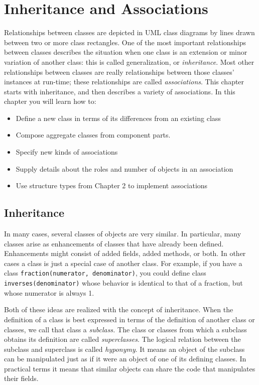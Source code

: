 \chapter{Inheritance and Associations}

Relationships between classes are depicted in UML class diagrams by
lines drawn between two or more class rectangles. One of the most
important relationships between classes describes the situation when
one class is an extension or minor variation of another class: this is
called generalization, or \textit{inheritance}. Most other
relationships between classes are really relationships between those
classes' instances at run-time; these
relationships are called \textit{associations}. This chapter starts
with inheritance, and then describes a variety of associations.
In this chapter you will learn how to:
\begin{itemize}\itemsep0pt
  \item Define a new class in terms of its differences from an existing class
  \item Compose aggregate classes from component parts.
  \item Specify new kinds of associations
  \item Supply details about the roles and number of objects in an association
  \item Use structure types from Chapter 2 to implement associations
\end{itemize}

\section{Inheritance}

In many cases, several classes of objects are very similar. In
particular, many classes arise as enhancements of classes that have
already been defined. Enhancements might consist of added fields, added
methods, or both. In other cases a class is just a special case of
another class. For example, if you have a class
\texttt{fraction(numerator, denominator)}, you could define class
\texttt{inverses(denominator)} whose behavior is identical to that of a
fraction, but whose numerator is always 1. 

Both of these ideas are realized with the concept of
inheritance. When the definition of a class is best
expressed in terms of the definition of another class or classes, we
call that class a \textit{subclass.} The class or
classes from which a subclass obtains its definition are called
\textit{superclass}\textit{es}. The logical relation
between the subclass and superclass is called \textit{hyponymy}. It
means an object of the subclass can be manipulated just as if it were
an object of one of its defining classes. In practical terms it means
that similar objects can share the code that manipulates their fields.

